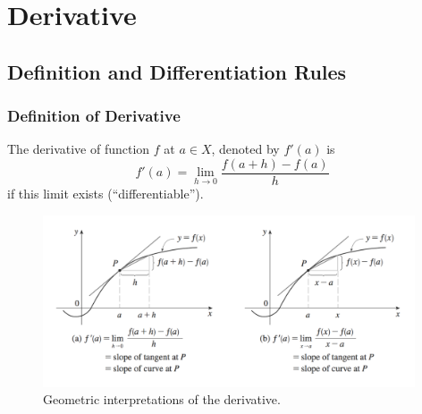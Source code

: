 \documentclass{beamer}
\begin{document}


\section{Derivative}
\subsection{Definition and Differentiation Rules}
\begin{frame}
\frametitle{Definition of Derivative}
The derivative of function $f$ at $a\in X$, denoted by $f'(a)$ is
$$
f'(a) = \lim_{h \rightarrow 0} \frac{f(a+h)-f(a)}{h}
$$
if this limit exists (``differentiable'').
\vspace*{-0.1in}
\begin{figure}[H]
\centering
\includegraphics[width=11cm]{Derivative.png}
\vspace*{-0.15in}
\caption{Geometric interpretations of the derivative.}
\end{figure}

\end{frame}
\end{document}
